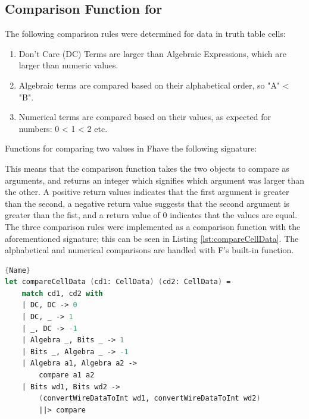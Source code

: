 \subsection{Comparison Function for }
The following comparison rules were determined for data in truth table cells:
\begin{enumerate}
    \item Don't Care (DC) Terms are larger than Algebraic Expressions, which are larger than numeric values.
    \item Algebraic terms are compared based on their alphabetical order, so "A" < "B".
    \item Numerical terms are compared based on their values, as expected for numbers: 0 < 1 < 2 etc.
\end{enumerate}

Functions for comparing two values in F\fsharp have the following signature:
\begin{center}
\end{center}
This means that the comparison function takes the two objects to compare as arguments, and returns an integer which signifies which argument was larger than the other. A positive return values indicates that the first argument is greater than the second, a negative return value suggests that the second argument is greater than the fist, and a return value of 0 indicates that the values are equal. The three comparison rules were implemented as a comparison function with the aforementioned signature; this can be seen in Listing \ref{lst:compareCellData}. The alphabetical and numerical comparisons are handled with F\fsharp's built-in  function.

\begin{lstlisting}[caption=Function to compare two \codestyle{CellData} values,frame=tlrb, language=FSharp, label=lst:compareCellData]{Name}
let compareCellData (cd1: CellData) (cd2: CellData) =
    match cd1, cd2 with
    | DC, DC -> 0
    | DC, _ -> 1
    | _, DC -> -1
    | Algebra _, Bits _ -> 1 
    | Bits _, Algebra _ -> -1
    | Algebra a1, Algebra a2 -> 
        compare a1 a2
    | Bits wd1, Bits wd2 ->
        (convertWireDataToInt wd1, convertWireDataToInt wd2)
        ||> compare
\end{lstlisting}

